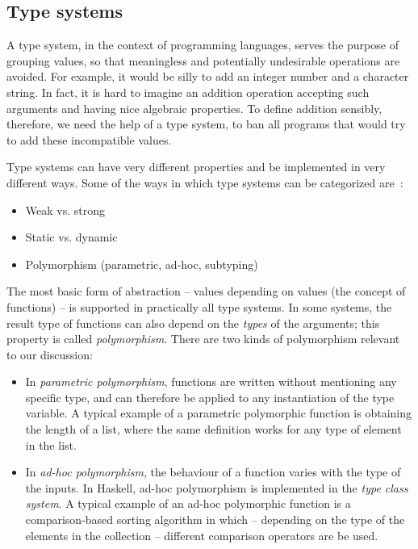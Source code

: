         \subsection{Type systems}
        \label{subsec:type-systems}
            A type system, in the context of programming languages,
            serves the purpose of grouping values, so that meaningless and potentially undesirable operations are avoided.
            For example, it would be silly to add an integer number and a character string.
            In fact, it is hard to imagine an addition operation accepting such arguments and having nice algebraic properties.
            To define addition sensibly, therefore, we need the help of a type system,
            to ban all programs that would try to add these incompatible values.

            Type systems can have very different properties and be implemented in very different ways.
            Some of the ways in which type systems can be categorized are~\cite{understanding-types-cardelli}:

            \begin{itemize}
                \item Weak vs. strong
                \item Static vs. dynamic
                \item Polymorphism (parametric, ad-hoc, subtyping)
            \end{itemize}

            The most basic form of abstraction -- values depending on values (the concept of functions) -- is
            supported in practically all type systems.
            In some systems, the result type of functions can also depend on the \emph{types} of the arguments;
            this property is called \emph{polymorphism}.
            There are two kinds of polymorphism relevant to our discussion:

            \begin{itemize}
                \item In \emph{parametric polymorphism}, functions are written without mentioning any specific type,
                    and can therefore be applied to any instantiation of the type variable.
                    A typical example of a parametric polymorphic function is obtaining the length of a list,
                    where the same definition works for any type of element in the list.

                \item In \emph{ad-hoc polymorphism}, the behaviour of a function varies with the type of the inputs.
                    In Haskell, ad-hoc polymorphism is implemented in the \emph{type class system}.
                    A typical example of an ad-hoc polymorphic function is a comparison-based sorting algorithm
                    in which -- depending on the type of the elements in the collection -- different
                    comparison operators are be used.
            \end{itemize}

